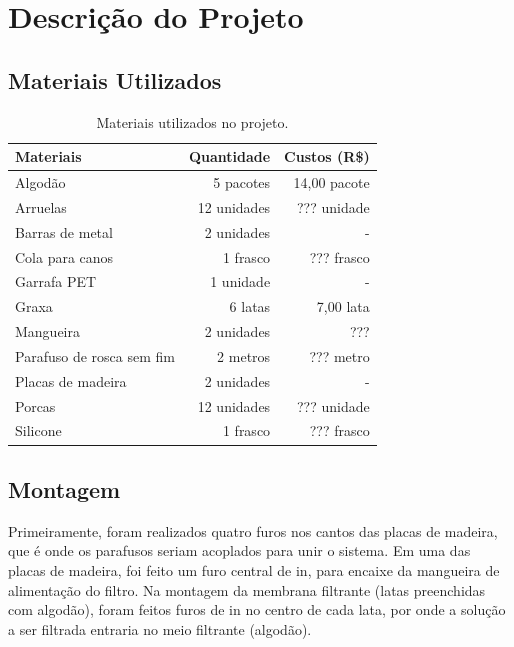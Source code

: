 \chapter{Descrição do Projeto}\label{descricao}

\section{Materiais Utilizados}

\begin{table}[H]
\centering
\caption{Materiais utilizados no projeto.}
\label{tab:materiais}
\begin{tabular}{lrr}
\multicolumn{1}{l}{\textbf{Materiais}} & \multicolumn{1}{l}{\textbf{Quantidade}} & \multicolumn{1}{l}{\textbf{Custos (R\$)}} \\\toprule
Algodão                   & 5 pacotes   & 14,00 pacote \\
Arruelas                  & 12 unidades & ??? unidade  \\
Barras de metal           & 2 unidades  & -            \\
Cola para canos           & 1 frasco    & ??? frasco   \\
Garrafa PET               & 1 unidade   & -            \\
Graxa                     & 6 latas     & 7,00 lata    \\
Mangueira                 & 2 unidades  & ???          \\
Parafuso de rosca sem fim & 2 metros    & ??? metro    \\
Placas de madeira         & 2 unidades  & -            \\
Porcas                    & 12 unidades & ??? unidade  \\
Silicone                  & 1 frasco    & ??? frasco   \\ \bottomrule
\end{tabular}
\end{table}

\section{Montagem}
\label{sec:montagem}

Primeiramente, foram realizados quatro furos nos cantos das placas de madeira,
que é onde os parafusos seriam acoplados para unir o sistema. Em uma das placas
de madeira, foi feito um furo central de  \si{in}, para encaixe
da mangueira de alimentação do filtro. Na montagem da membrana filtrante (latas
preenchidas com algodão), foram feitos furos de  \si{in} no
centro de cada lata, por onde a solução a ser filtrada entraria no meio
filtrante (algodão).

